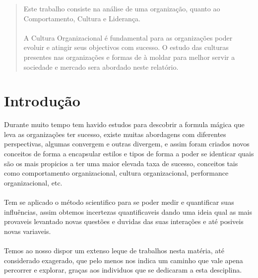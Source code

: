 

\tableofcontents
\pagestyle{plain} %
\newpage
\label{Resumo}
\begin{abstract} 
Este trabalho consiste na análise de uma organização, quanto ao Comportamento, Cultura e Liderança.\\

\noindent \\
A Cultura Organizacional é fundamental para as organizações poder evoluir e atingir seus objectivos com sucesso. O estudo das culturas presentes nas organizações e formas de à moldar para melhor servir a sociedade e mercado sera abordado neste relatório.
\end{abstract}


\newpage
\section{Introdução}

	Durante muito tempo tem havido estudos para descobrir a formula mágica que leva as organizações ter sucesso, existe muitas abordagens com diferentes perspectivas, algumas convergem e outras divergem, e assim foram criados novos conceitos de forma a encapsular estilos e tipos de forma a poder se identicar quais são os mais propicios a ter uma maior elevada taxa de sucesso, conceitos tais como comportamento organizacional, cultura organizacional, performance organizacional, etc.\\

\noindent \\
Tem se aplicado o método scientifico para se poder medir e quantificar suas influências, assim obtemos incertezas quantificaveis dando uma ideia qual as mais provaveis levantado novas questões e duvidas das suas interações e até posiveis novas variaveis.\\

\noindent \\
Temos ao nosso dispor um extenso leque de trabalhos nesta matéria, até considerado exagerado, que pelo menos nos indica um caminho que vale apena percorrer e explorar, graças aos individuos que se dedicaram a esta desciplina.\\


